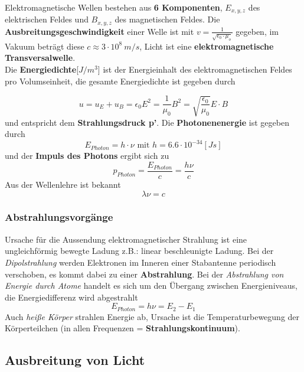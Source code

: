 \documentclass[12pt,a4paper,ngerman]{article}
\begin{document}
Elektromagnetische Wellen bestehen aus \textbf{6 Komponenten}, $E_{x,y,z}$ des elektrischen Feldes und $B_{x,y,z}$ des magnetischen Feldes. Die \textbf{Ausbreitungsgeschwindigkeit} einer Welle ist mit $v = \frac{1}{\sqrt{\epsilon_0 \cdot \mu_o}}$ gegeben, im Vakuum beträgt diese $c \approx 3\cdot 10^8 \ m/s$, Licht ist eine \textbf{elektromagnetische Transversalwelle}. \\
Die \textbf{Energiedichte}[$J/m^3$] ist der Energieinhalt des elektromagnetischen Feldes pro Volumseinheit, die gesamte Energiedichte ist gegeben durch

\begin{equation}
u = u_E + u_B =\epsilon_0 E^2 = \frac{1}{\mu_0}B^2 = \sqrt{\frac{\epsilon_0}{\mu_0}}E \cdot B
\end{equation}
und entspricht dem \textbf{Strahlungsdruck p'}. Die \textbf{Photonenenergie} ist gegeben durch
\begin{equation}
E_{Photon} = h \cdot \nu \text{ mit } h = 6.6 \cdot 10^{-34} [Js]
\end{equation}
und der \textbf{Impuls des Photons} ergibt sich zu 
\begin{equation}
p_{Photon} = \frac{E_{Photon}}{c} = \frac{h\nu}{c}
\end{equation}
Aus der Wellenlehre ist bekannt
\begin{equation}
\lambda\nu = c
\end{equation}
\subsubsection*{Abstrahlungsvorgänge}
Ursache für die Aussendung elektromagnetischer Strahlung ist eine ungleichförmig bewegte Ladung z.B.: linear beschleunigte Ladung. Bei der \textit{Dipolstrahlung} werden Elektronen im Inneren einer Stabantenne periodisch verschoben, es kommt dabei zu einer \textbf{Abstrahlung}. 
Bei der \textit{Abstrahlung von Energie durch Atome} handelt es sich um den Übergang zwischen Energieniveaus, die Energiedifferenz wird abgestrahlt
\begin{equation}
E_{Photon} = h\nu = E_2-E_1
\end{equation}
Auch \textit{heiße Körper} strahlen Energie ab, Ursache ist die Temperaturbewegung der Körperteilchen (in allen Frequenzen = \textbf{Strahlungskontinuum}).

\subsection{Ausbreitung von Licht}
\end{document}
